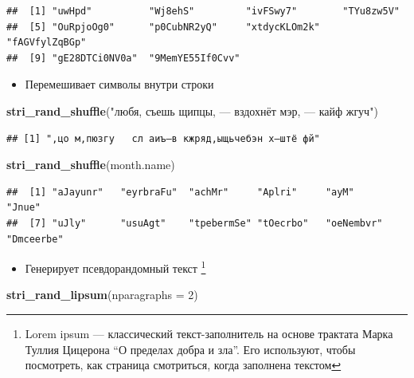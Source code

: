 \documentclass[
]{book}
\newenvironment{Shaded}{\begin{snugshade}}{\end{snugshade}}
\newcommand{\DataTypeTok}[1]{\textcolor[rgb]{0.13,0.29,0.53}{#1}}
\newcommand{\DecValTok}[1]{\textcolor[rgb]{0.00,0.00,0.81}{#1}}
\newcommand{\KeywordTok}[1]{\textcolor[rgb]{0.13,0.29,0.53}{\textbf{#1}}}
\newcommand{\NormalTok}[1]{#1}
\newcommand{\StringTok}[1]{\textcolor[rgb]{0.31,0.60,0.02}{#1}}
\providecommand{\tightlist}{%
  \setlength{\itemsep}{0pt}\setlength{\parskip}{0pt}}
\begin{document}
\begin{verbatim}
##  [1] "uwHpd"          "Wj8ehS"         "ivFSwy7"        "TYu8zw5V"      
##  [5] "OuRpjoOg0"      "p0CubNR2yQ"     "xtdycKLOm2k"    "fAGVfylZqBGp"  
##  [9] "gE28DTCi0NV0a"  "9MemYE55If0Cvv"
\end{verbatim}

\begin{itemize}
\tightlist
\item
  Перемешивает символы внутри строки
\end{itemize}

\begin{Shaded}
\begin{Highlighting}[]
\KeywordTok{stri_rand_shuffle}\NormalTok{(}\StringTok{"любя, съешь щипцы, — вздохнёт мэр, — кайф жгуч"}\NormalTok{)}
\end{Highlighting}
\end{Shaded}

\begin{verbatim}
## [1] ",цо м,пюзгу   сл аиъ—в кжряд,ыщьчебэн х—штё фй"
\end{verbatim}

\begin{Shaded}
\begin{Highlighting}[]
\KeywordTok{stri_rand_shuffle}\NormalTok{(month.name)}
\end{Highlighting}
\end{Shaded}

\begin{verbatim}
##  [1] "aJayunr"   "eyrbraFu"  "achMr"     "Aplri"     "ayM"       "Jnue"     
##  [7] "uJly"      "usuAgt"    "tpebermSe" "tOecrbo"   "oeNembvr"  "Dmceerbe"
\end{verbatim}

\begin{itemize}
\tightlist
\item
  Генерирует псевдорандомный текст \footnote{Lorem ipsum --- классический текст-заполнитель на основе трактата Марка Туллия Цицерона ``О пределах добра и зла''. Его используют, чтобы посмотреть, как страница смотриться, когда заполнена текстом}
\end{itemize}

\begin{Shaded}
\begin{Highlighting}[]
\KeywordTok{stri_rand_lipsum}\NormalTok{(}\DataTypeTok{nparagraphs =} \DecValTok{2}\NormalTok{)}
\end{Highlighting}
\end{Shaded}
\end{document}
